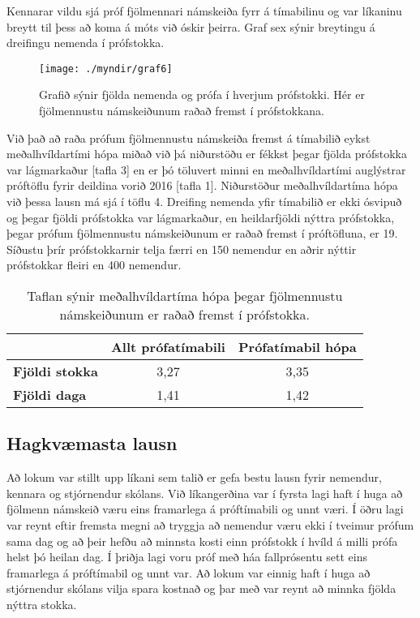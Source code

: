 \documentclass[12pt]{article}
\begin{document}
Kennarar vildu sjá próf fjölmennari námskeiða fyrr á tímabilinu og var líkaninu breytt til þess að koma á móts við óskir þeirra. Graf sex sýnir breytingu á dreifingu nemenda í prófstokka.


\begin{figure}[h]
    \centering
    \texttt{[image: ./myndir/graf6]}
    \caption{Grafið sýnir fjölda nemenda og prófa í hverjum prófstokki. Hér er fjölmennustu námskeiðunum raðað fremst í prófstokkana.}
\end{figure}

\newpage

Við það að raða prófum fjölmennustu námskeiða fremst á tímabilið eykst meðalhvíldartími hópa miðað við þá niðurstöðu er fékkst þegar fjölda prófstokka var lágmarkaður [tafla 3] en er þó töluvert minni en meðalhvíldartími auglýstrar próftöflu fyrir deildina vorið 2016 [tafla 1]. Niðurstöður meðalhvíldartíma hópa við þessa lausn má sjá í töflu 4.
Dreifing nemenda yfir tímabilið er ekki ósvipuð og þegar fjöldi prófstokka var lágmarkaður, en heildarfjöldi nýttra prófstokka, þegar prófum fjölmennustu námskeiðunum er raðað fremst í próftöfluna, er 19. Síðustu þrír prófstokkarnir telja færri en 150 nemendur en aðrir nýttir prófstokkar fleiri en 400 nemendur.


\begin{table}[h]
    \centering
    \begin{tabular}{l|c|c|}
        \cline{2-3}
        & \multicolumn{1}{l|}{\textbf{Allt prófatímabili}} & \multicolumn{1}{l|}{\textbf{Prófatímabil hópa}} \\ \hline
        \multicolumn{1}{|l|}{\textbf{Fjöldi stokka}} & 3,27                                             & 3,35                                            \\ \hline
        \multicolumn{1}{|l|}{\textbf{Fjöldi daga}}   & 1,41                                             & 1,42                                            \\ \hline
    \end{tabular}
    \caption{Taflan sýnir meðalhvíldartíma hópa þegar fjölmennustu námskeiðunum er raðað fremst í prófstokka.}
\end{table}

\subsection{Hagkvæmasta lausn}

Að lokum var stillt upp líkani sem talið er gefa bestu lausn fyrir nemendur, kennara og stjórnendur skólans.  Við líkangerðina var í fyrsta lagi haft í huga að fjölmenn námskeið væru eins framarlega á próftímabili og unnt væri. Í öðru lagi var reynt eftir fremsta megni að tryggja að nemendur væru ekki í tveimur prófum sama dag og að þeir hefðu að minnsta kosti einn prófstokk í hvíld á milli prófa helst þó heilan dag. Í þriðja lagi voru próf með háa fallprósentu sett eins framarlega á próftímabil og unnt var. Að lokum var einnig haft í huga að stjórnendur skólans vilja spara kostnað og þar með var reynt að minnka fjölda nýttra stokka. 
\end{document}
